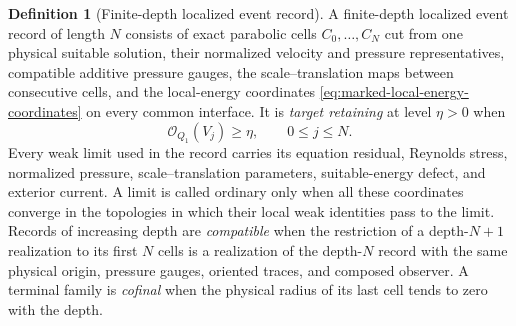 \documentclass[11pt]{amsart}
\numberwithin{equation}{section}
\theoremstyle{plain}
\theoremstyle{definition}
\newtheorem{definition}[definition]{Definition}
\theoremstyle{remark}
\begin{document}
\begin{definition}[Finite-depth localized event record]
\label{def:finite-depth-localized-event-record}
A finite-depth localized event record of length \(N\) consists of exact
parabolic cells \(C_0,\ldots,C_N\) cut from one physical suitable solution,
their normalized velocity and pressure representatives, compatible additive
pressure gauges, the scale--translation maps between consecutive cells, and
the local-energy coordinates
\eqref{eq:marked-local-energy-coordinates} on every common interface.  It is
\emph{target retaining} at level \(\eta>0\) when
\begin{equation}\label{eq:finite-record-target-floor}
 \mathcal O_{Q_1}(V_j)\ge\eta,
 \qquad 0\le j\le N.
\end{equation}
Every weak limit used in the record carries its equation residual, Reynolds
stress, normalized pressure, scale--translation parameters, suitable-energy
defect, and exterior current.  A limit is called ordinary only when all these
coordinates converge in the topologies in which their local weak identities
pass to the limit.
Records of increasing depth are \emph{compatible} when the restriction of a
depth-\(N+1\) realization to its first \(N\) cells is a realization of the
depth-\(N\) record with the same physical origin, pressure gauges, oriented
traces, and composed observer.  A terminal family is \emph{cofinal} when the
physical radius of its last cell tends to zero with the depth.
\end{definition}
\end{document}

